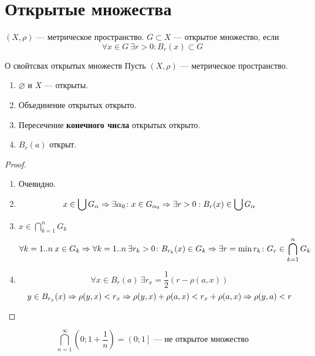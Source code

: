 \section{Открытые множества}
\begin{Def}
$(X, \rho)$ --- метрическое пространство. $G \subset X$ --- открытое множество, если $$\forall x \in G\: \exists r > 0\colon B_r(x) \subset G$$
\end{Def}

\begin{theorem}{О свойтсвах открытых множеств}
Пусть $(X, \rho)$ --- метрическое пространство.
\begin{enumerate}
\item $\varnothing$ и $X$ --- открыты.
\item Объединение открытых открыто.
\item Пересечение \textbf{конечного числа} открытых открыто.
\item $B_r(a)$ открыт.
\end{enumerate}
\end{theorem}
\begin{proof}
\begin{enumerate}
\item Очевидно.
\item $$x \in \bigcup G_\alpha \Rightarrow \exists \alpha_0 \colon x \in G_{\alpha_0} \Rightarrow \exists r > 0: B_r(x) \in \bigcup G_\alpha$$
\item $x \in \bigcap_{k=1}^n G_k$ 
$$ \forall k=1..n\: x \in G_k \Rightarrow \forall k=1..n\: \exists r_k > 0\colon B_{r_k}(x) \in G_k \Rightarrow \exists r = \min{r_k}\colon G_r \in \bigcap_{k=1}^n G_k$$
\item $$\forall x \in B_r(a)\: \exists r_x = \frac12 \left(r - \rho(a, x)\right)$$
$$y \in B_{r_x}(x) \Rightarrow \rho(y, x) < r_x \Rightarrow \rho(y, x) + \rho(a, x) < r_x + \rho(a, x) \Rightarrow \rho(y, a) < r$$
\end{enumerate}
\end{proof}

\begin{Rem}
$$\bigcap_{n=1}^\infty \left(0; 1 + \frac1n\right) = \left(0;1\right] \text{ --- не открытое множество}$$
\end{Rem}
